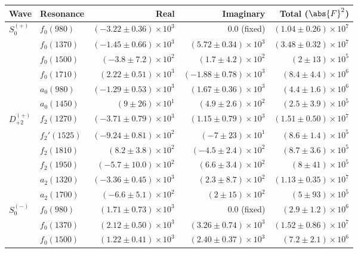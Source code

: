 \begin{table}[ht]
    \begin{center}
        \begin{tabular}{llrrr}\toprule
        Wave & Resonance & Real & Imaginary & Total ($\abs{F}^2$) \\\midrule
$S_{0}^{(+)}$ & $f_{0}(980)$ & $(-3.22 \pm 0.36) \times 10^{3}$ & $0.0$ (fixed) & $(1.04 \pm 0.26) \times 10^{7}$ \\
 & $f_{0}(1370)$ & $(-1.45 \pm 0.66) \times 10^{3}$ & $(5.72 \pm 0.34) \times 10^{3}$ & $(3.48 \pm 0.32) \times 10^{7}$ \\
 & $f_{0}(1500)$ & $(-3.8 \pm 7.2) \times 10^{2}$ & $(1.7 \pm 4.2) \times 10^{2}$ & $(2 \pm 13) \times 10^{5}$ \\
 & $f_{0}(1710)$ & $(2.22 \pm 0.51) \times 10^{3}$ & $(-1.88 \pm 0.78) \times 10^{3}$ & $(8.4 \pm 4.4) \times 10^{6}$ \\
 & $a_{0}(980)$ & $(-1.29 \pm 0.53) \times 10^{3}$ & $(1.67 \pm 0.36) \times 10^{3}$ & $(4.4 \pm 1.6) \times 10^{6}$ \\
 & $a_{0}(1450)$ & $(9 \pm 26) \times 10^{1}$ & $(4.9 \pm 2.6) \times 10^{2}$ & $(2.5 \pm 3.9) \times 10^{5}$ \\
$D_{+2}^{(+)}$ & $f_{2}(1270)$ & $(-3.71 \pm 0.79) \times 10^{3}$ & $(1.15 \pm 0.79) \times 10^{3}$ & $(1.51 \pm 0.50) \times 10^{7}$ \\
 & $f_{2}'(1525)$ & $(-9.24 \pm 0.81) \times 10^{2}$ & $(-7 \pm 23) \times 10^{1}$ & $(8.6 \pm 1.4) \times 10^{5}$ \\
 & $f_{2}(1810)$ & $(8.2 \pm 3.8) \times 10^{2}$ & $(-4.5 \pm 2.4) \times 10^{2}$ & $(8.7 \pm 3.6) \times 10^{5}$ \\
 & $f_{2}(1950)$ & $(-5.7 \pm 10.0) \times 10^{2}$ & $(6.6 \pm 3.4) \times 10^{2}$ & $(8 \pm 41) \times 10^{5}$ \\
 & $a_{2}(1320)$ & $(-3.36 \pm 0.45) \times 10^{3}$ & $(2.3 \pm 8.7) \times 10^{2}$ & $(1.13 \pm 0.35) \times 10^{7}$ \\
 & $a_{2}(1700)$ & $(-6.6 \pm 5.1) \times 10^{2}$ & $(2 \pm 15) \times 10^{2}$ & $(5 \pm 93) \times 10^{5}$ \\
$S_{0}^{(-)}$ & $f_{0}(980)$ & $(1.71 \pm 0.73) \times 10^{3}$ & $0.0$ (fixed) & $(2.9 \pm 1.2) \times 10^{6}$ \\
 & $f_{0}(1370)$ & $(2.12 \pm 0.50) \times 10^{3}$ & $(3.26 \pm 0.74) \times 10^{3}$ & $(1.52 \pm 0.86) \times 10^{7}$ \\
 & $f_{0}(1500)$ & $(1.22 \pm 0.41) \times 10^{3}$ & $(2.40 \pm 0.37) \times 10^{3}$ & $(7.2 \pm 2.1) \times 10^{6}$ \\

\end{tabular}
\end{center}
\end{table}
